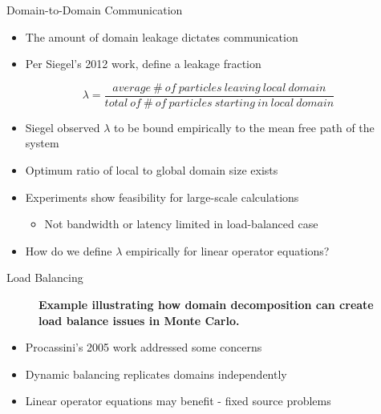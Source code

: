 \documentclass{beamer}
\begin{document}
\begin{frame}{Domain-to-Domain Communication}

  \begin{itemize}
  \item The amount of domain leakage dictates communication
    \medskip
  \item Per Siegel's 2012 work, define a leakage fraction
  \end{itemize}

  \[
  \lambda =
  \frac{average\ \#\ of\ particles\ leaving\ local\ domain}{total\ 
    of\ \#\ of\ particles\ starting\ in\ local\ domain}
  \]

  \medskip
  \begin{itemize}
  \item Siegel observed $\lambda$ to be bound empirically to the mean
    free path of the system
    \medskip
  \item Optimum ratio of local to global domain size exists
    \medskip
  \item Experiments show feasibility for large-scale calculations
    \begin{itemize}
    \item Not bandwidth or latency limited in load-balanced case
    \end{itemize}
    \pause
    \medskip
  \item How do we define $\lambda$ empirically for linear operator
    equations? 
  \end{itemize}

\end{frame}

\begin{frame}{Load Balancing}

  \begin{figure}[htpb!]
    \begin{center}
      \scalebox{1.0}{  }
    \end{center}
    \caption{\textbf{Example illustrating how domain decomposition can
        create load balance issues in Monte Carlo.}}
    \label{fig:procassini_example}
  \end{figure}

  \begin{itemize}
  \item Procassini's 2005 work addressed some concerns
  \item Dynamic balancing replicates domains independently
  \item Linear operator equations may benefit - fixed source problems
  \end{itemize}

\end{frame}
\end{document}
